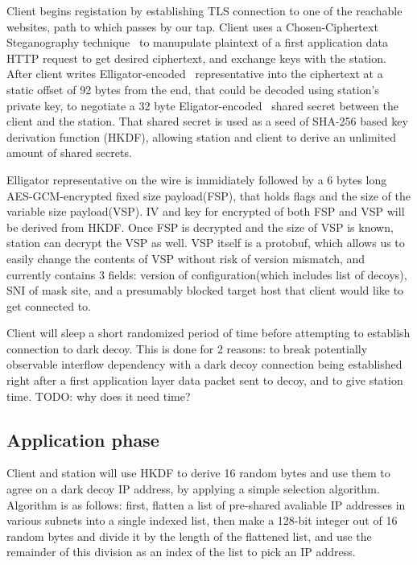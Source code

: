 \documentclass[letterpaper,twocolumn,10pt]{article}
\begin{document}
Client begins registation by establishing TLS connection
to one of the reachable websites,
path to which passes by our tap.
Client uses a Chosen-Ciphertext Steganography technique~\cite{tapdance} to manupulate
plaintext of a first application data HTTP request
to get desired ciphertext,
and exchange keys with the station.
After client writes Elligator-encoded~\cite{elligator} representative into the ciphertext at a static offset of 92 bytes from the end,
that could be decoded using station's private key,
to negotiate a 32 byte Eligator-encoded~\cite{elligator} shared secret between the client and the station.
That shared secret is used as a seed of SHA-256 based key derivation function (HKDF),
allowing station and client to derive an unlimited amount of shared secrets.

Elligator representative on the wire is immidiately followed by a 6 bytes long AES-GCM-encrypted
fixed size payload(FSP), that holds flags and the size of the variable size payload(VSP).
IV and key for encrypted of both FSP and VSP will be derived from HKDF.
Once FSP is decrypted and the size of VSP is known, station can decrypt the VSP as well.
VSP itself is a protobuf, which allows us to easily change the contents of VSP without risk of version mismatch, and currently contains 3 fields: version of configuration(which includes list of decoys), SNI of mask site, and a presumably blocked target host that client would like to get connected to.

Client will sleep a short randomized period of time before attempting to establish connection to dark decoy.
This is done for 2 reasons: to break potentially observable interflow dependency with a dark decoy connection being established right after a first application layer data packet sent to decoy,
and to give station time.
TODO: why does it need time?

\subsection{Application phase}
Client and station will use HKDF to derive 16 random bytes and use them to
agree on a dark decoy IP address, by applying a simple selection algorithm.
Algorithm is as follows: first, flatten a list of pre-shared avaliable IP
addresses in various subnets into a single indexed list, then make a 128-bit
integer out of 16 random bytes and divide it by the length
of the flattened list, and use the remainder of this division as an index
of the list to pick an IP address.
\end{document}
